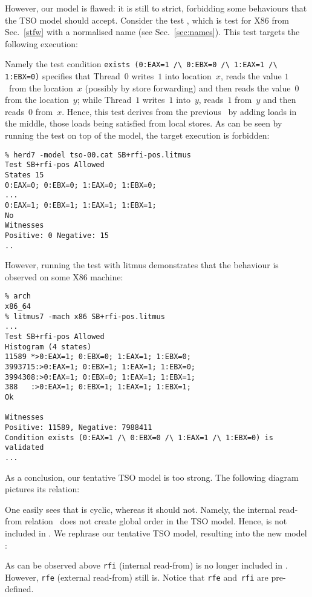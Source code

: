 However,
our model  is flawed: it is still to strict,
forbidding some behaviours that the TSO model should accept.
Consider the test ,
which is test  for X86 from Sec.~\ref{stfw} with a normalised name (see Sec.~\ref{sec:names}).
This test targets the following execution:
\begin{center}\end{center}
Namely the test condition
\verb+exists (0:EAX=1 /\ 0:EBX=0 /\ 1:EAX=1 /\ 1:EBX=0)+
specifies that Thread~$0$ writes~$1$ into location~$x$,
reads the value $1$~from the location~$x$ (possibly by store forwarding) and
then reads the value~$0$ from the location~$y$;
while Thread~$1$ writes~$1$ into~$y$,
reads~$1$ from~$y$ and then reads~$0$ from~$x$.
Hence, this test derives from the previous~
by adding loads in the middle, those loads
being  satisfied from local stores.
As can be seen by running the test on top of the 
model, the target execution is forbidden:
\begin{verbatim}
% herd7 -model tso-00.cat SB+rfi-pos.litmus 
Test SB+rfi-pos Allowed
States 15
0:EAX=0; 0:EBX=0; 1:EAX=0; 1:EBX=0;
...
0:EAX=1; 0:EBX=1; 1:EAX=1; 1:EBX=1;
No
Witnesses
Positive: 0 Negative: 15
..
\end{verbatim}
However, running the test with litmus demonstrates that the behaviour
is observed on some X86 machine:
\begin{verbatim}
% arch
x86_64
% litmus7 -mach x86 SB+rfi-pos.litmus
...
Test SB+rfi-pos Allowed
Histogram (4 states)
11589 *>0:EAX=1; 0:EBX=0; 1:EAX=1; 1:EBX=0;
3993715:>0:EAX=1; 0:EBX=1; 1:EAX=1; 1:EBX=0;
3994308:>0:EAX=1; 0:EBX=0; 1:EAX=1; 1:EBX=1;
388   :>0:EAX=1; 0:EBX=1; 1:EAX=1; 1:EBX=1;
Ok

Witnesses
Positive: 11589, Negative: 7988411
Condition exists (0:EAX=1 /\ 0:EBX=0 /\ 1:EAX=1 /\ 1:EBX=0) is validated
...
\end{verbatim}
As a conclusion, our tentative TSO model is too strong.
The following diagram pictures its  relation:
\begin{center}\end{center}
One easily sees that  is cyclic, whereas it should not.
Namely, the internal read-from relation~ does
not create global order in the TSO model.
Hence,  is not included in .
We rephrase our tentative TSO model, resulting into the new model
:

As can be observed above \texttt{rfi} (internal read-from) is no longer
included in . However, \texttt{rfe} (external read-from)
still is. Notice that \texttt{rfe} and~\texttt{rfi} are pre-defined.


